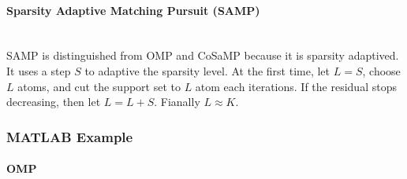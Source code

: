 \documentclass[12pt]{ctexart}
\begin{document}
\paragraph{\textbf{Sparsity Adaptive Matching Pursuit (SAMP)}}\mbox{}\\
SAMP is distinguished from OMP and CoSaMP because it is sparsity adaptived. It
uses a step $S$ to adaptive the sparsity level. At the first time, let $L = S$,
choose $L$ atoms, and cut the support set to $L$ atom each iterations. If the
residual stops decreasing, then let $L = L + S$. Fianally $L \approx K$.

\subsubsection{\textbf{MATLAB Example}}

\paragraph{\textbf{OMP}}
\end{document}
